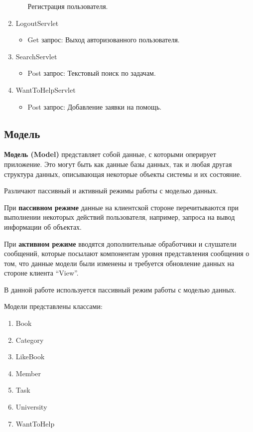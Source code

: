 \begin{enumerate}
\begin{itemize}
	Регистрация пользователя.
	\end{itemize}
\item LogoutServlet
	\begin{itemize} 
	\item Get запрос:
	Выход авторизованного пользователя.
	\end{itemize}
\item SearchServlet
	\begin{itemize} 
	\item Post запрос:
	Текстовый поиск по задачам.
	\end{itemize}
\item WantToHelpServlet
	\begin{itemize} 
	\item Post запрос:
	Добавление заявки на помощь.
	\end{itemize}

\end{enumerate}

\subsection{Модель}

\textbf{Модель (Model)} представляет собой данные, с которыми оперирует приложение. Это могут быть как данные базы данных, так и любая другая структура данных, описывающая некоторые объекты системы и их состояние.

Различают пассивный и активный режимы работы с моделью данных.

При \textbf{пассивном режиме} данные на клиентской стороне перечитываются при выполнении некоторых действий пользователя, например, запроса на вывод информации об объектах.

При \textbf{активном режиме} вводятся дополнительные обработчики и слушатели сообщений, которые посылают компонентам уровня представления сообщения о том, что данные модели были изменены и требуется обновление данных на стороне клиента “View”.

В данной работе используется пассивный режим работы с моделью данных.

Модели представлены классами:
\begin{enumerate}
\item Book
\item Category
\item LikeBook
\item Member
\item Task
\item University
\item WantToHelp
\end{enumerate}

